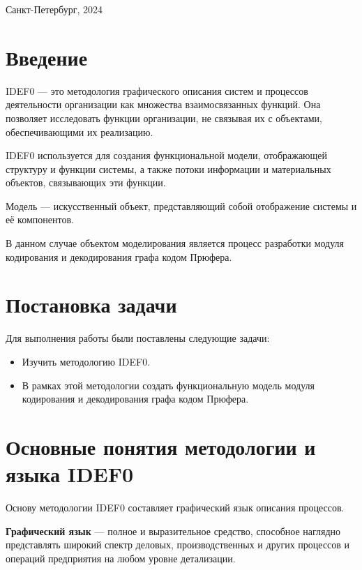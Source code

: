 \documentclass[a4paper, final]{article}
\begin{document}
\hfill \break
\hfill \break
\begin{center} \small{Санкт-Петербург, 2024} \end{center}
\thispagestyle{empty} %

\newpage

\tableofcontents

\newpage

\cleardoublepage
{}
{}
\section*{Введение}
IDEF0 --- это методология графического описания систем и процессов деятельности организации как множества 
взаимосвязанных функций. Она позволяет исследовать функции организации, не связывая их с объектами, обеспечивающими
их реализацию.

IDEF0 используется для создания функциональной модели, отображающей структуру и функции системы, а также потоки 
информации и материальных объектов, связывающих эти функции.

Модель --- искусственный объект, представляющий собой отображение системы и её компонентов.

В данном случае объектом моделирования является процесс разработки модуля кодирования и декодирования графа 
кодом Прюфера.

\newpage
\section{Постановка задачи}
\noindent Для выполнения работы были поставлены следующие задачи:
\begin{itemize}
	\item Изучить методологию IDEF0.
	\item В рамках этой методологии создать функциональную модель модуля кодирования и декодирования графа кодом Прюфера.
\end{itemize}

\newpage
\section{Основные понятия методологии и языка IDEF0}
Основу методологии IDEF0 составляет графический язык описания процессов.

{\bf Графический язык} --- полное и выразительное средство, способное наглядно представлять широкий спектр деловых, 
производственных и других процессов и операций предприятия на любом уровне детализации.
\end{document}
